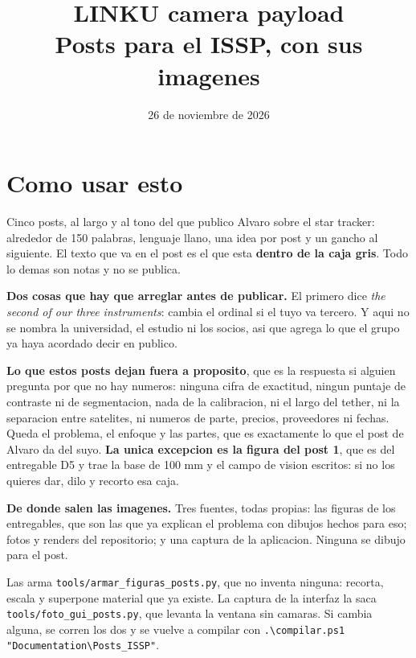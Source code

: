 \documentclass[11pt,a4paper]{article}
\title{\vspace{-1.5cm}LINKU camera payload\\[2mm]
       \large Posts para el ISSP, con sus imagenes}
\author{}
\date{26 de noviembre de 2026}
\newcommand{\nota}[1]{{\color{notagris}\small #1\par}}
\begin{document}
\maketitle
\vspace{-1.2cm}

\section*{Como usar esto}

Cinco posts, al largo y al tono del que publico Alvaro sobre el star tracker:
alrededor de 150 palabras, lenguaje llano, una idea por post y un gancho al
siguiente. El texto que va en el post es el que esta \textbf{dentro de la caja
gris}. Todo lo demas son notas y no se publica.

\textbf{Dos cosas que hay que arreglar antes de publicar.} El primero dice
\emph{the second of our three instruments}: cambia el ordinal si el tuyo va
tercero. Y aqui no se nombra la universidad, el estudio ni los socios, asi que
agrega lo que el grupo ya haya acordado decir en publico.

\textbf{Lo que estos posts dejan fuera a proposito}, que es la respuesta si
alguien pregunta por que no hay numeros: ninguna cifra de exactitud, ningun
puntaje de contraste ni de segmentacion, nada de la calibracion, ni el largo
del tether, ni la separacion entre satelites, ni numeros de parte, precios,
proveedores ni fechas. Queda el problema, el enfoque y las partes, que es
exactamente lo que el post de Alvaro da del suyo. \textbf{La unica excepcion
es la figura del post 1}, que es del entregable D5 y trae la base de 100 mm y
el campo de vision escritos: si no los quieres dar, dilo y recorto esa caja.

\textbf{De donde salen las imagenes.} Tres fuentes, todas propias: las
figuras de los entregables, que son las que ya explican el problema con
dibujos hechos para eso; fotos y renders del repositorio; y una captura de
la aplicacion. Ninguna se dibujo para el post.

\vspace{2mm}
\nota{Las arma \texttt{tools/armar\_figuras\_posts.py}, que no inventa
ninguna: recorta, escala y superpone material que ya existe. La captura de la
interfaz la saca \texttt{tools/foto\_gui\_posts.py}, que levanta la ventana
sin camaras. Si cambia alguna, se corren los dos y se vuelve a compilar con
\texttt{.\textbackslash compilar.ps1 "Documentation\textbackslash Posts\_ISSP"}.}
\end{document}
